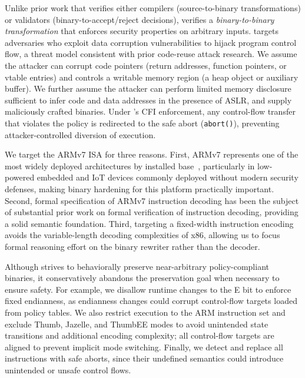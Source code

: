
Unlike prior work that verifies either compilers (\ie source-to-binary transformations) or validators (\ie binary-to-accept/reject decisions), \pname{} verifies a \emph{binary-to-binary transformation} that enforces security properties on arbitrary inputs.
%
\pname targets adversaries who exploit data corruption vulnerabilities to hijack program control flow, a threat model consistent with prior code-reuse attack research. We assume the attacker can corrupt code pointers (\eg return addresses, function pointers, or vtable entries) and controls a writable memory region (\eg a heap object or auxiliary buffer). We further assume the attacker can perform limited memory disclosure sufficient to infer code and data addresses in the presence of ASLR, and supply maliciously crafted binaries.
Under \pname's CFI enforcement, any control-flow transfer that violates the policy is redirected to the safe abort (\ie \texttt{abort()}), preventing attacker-controlled diversion of execution.

We target the ARMv7 ISA for three reasons. First, ARMv7 represents one of the most
widely deployed architectures by installed base~\cite{arm_field_growth,patterson2016computer}, particularly in low-powered embedded
and IoT devices commonly deployed without modern security defenses, making
binary hardening for this platform practically important. Second, formal
specification of ARMv7 instruction decoding has been the subject of
substantial prior work on formal verification of instruction decoding, providing a
solid semantic foundation. Third, targeting a fixed-width instruction encoding
avoids the variable-length decoding complexities of x86, allowing us to focus
formal reasoning effort on the binary rewriter rather than the decoder.

Although \pname strives to behaviorally preserve near-arbitrary policy-compliant binaries, it conservatively abandons the preservation goal when necessary to ensure safety.
For example, we disallow runtime changes to the \CPSR E bit to enforce fixed endianness, as endianness changes could corrupt control-flow targets loaded from policy tables.
%
We also restrict execution to the ARM instruction set and exclude Thumb, Jazelle, and ThumbEE modes to avoid unintended state transitions and additional encoding complexity; all control-flow targets are aligned to prevent implicit mode switching.
%
Finally, we detect and replace all \unpredictable{} instructions with safe aborts, since their undefined semantics could introduce unintended or unsafe control flows.

